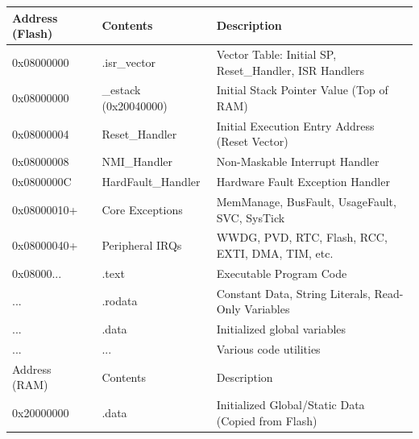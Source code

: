 \documentclass[../main.tex]{subfiles}
\begin{document}

            \begin{tabularx}{\textwidth}{|>{\ttfamily}p{2cm}|>{\ttfamily}p{2.8cm}|X|}
                \hline
                \rowcolor{HeaderDark}
                \color{white}Address (Flash) & \color{white}Contents & \color{white}Description\\ \hline
                \rowcolor{VectorBlue}
                0x08000000 & .isr\_vector & Vector Table: Initial SP, Reset\_Handler, ISR Handlers  \\ \hline
                \rowcolor{StackOrange}
                0x08000000 & \_estack (0x20040000) & Initial Stack Pointer Value (Top of RAM) \\ \hline
                \rowcolor{CodeBlue}
                0x08000004 & Reset\_Handler & Initial Execution Entry Address (Reset Vector) \\ \hline
                \rowcolor{VectorBlue}
                0x08000008 & NMI\_Handler & Non-Maskable Interrupt Handler \\ \hline
                \rowcolor{VectorBlue}
                0x0800000C & HardFault\_Handler & Hardware Fault Exception Handler \\ \hline
                \rowcolor{VectorBlue}
                0x08000010+ & Core Exceptions & MemManage, BusFault, UsageFault, SVC, SysTick \\ \hline
                \rowcolor{VectorBlue}
                0x08000040+ & Peripheral IRQs & WWDG, PVD, RTC, Flash, RCC, EXTI, DMA, TIM, etc. \\ \hline
                \rowcolor{CodeBlue}
                0x08000... & .text & Executable Program Code \\ \hline
                \rowcolor{RoDataBlue}
                ... & .rodata & Constant Data, String Literals, Read-Only Variables \\ \hline
                \rowcolor{RoDataBlue}
                ... & .data & Initialized global variables  \\ \hline
                \rowcolor{InitBlue}
                ... & ... & Various code utilities  \\ \hline
                \rowcolor{HeaderDark}
                \color{white}Address (RAM) & \color{white}Contents & \color{white}Description \\ \hline
                \rowcolor{DataGreen}
                0x20000000 & .data & Initialized Global/Static Data (Copied from Flash) \\ \hline

\end{tabularx}
\end{document}

